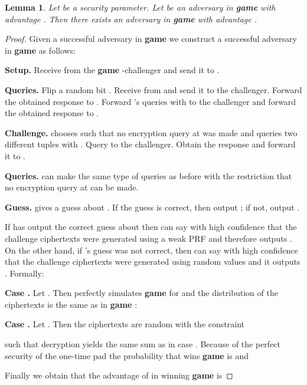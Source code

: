 \documentclass[10pt]{extarticle}
\newtheorem{Lem}[Thm]{Lemma}
\begin{document}
\begin{Lem}\label{gameonetwo} Let  be a security parameter. Let  be an adversary in \textbf{\upshape game } with advantage . Then there exists an adversary  in \textbf{\upshape game } with advantage .
\end{Lem}
\begin{proof} Given a successful adversary  in \textbf{game}  we construct a successful adversary  in \textbf{game}  as follows:
\noindent\begin{description}
 \item\textbf{Setup.} Receive  from the \textbf{game} -challenger and send it to .
\item\textbf{Queries.} Flip a random bit . Receive  from  and send it to the challenger. Forward the obtained response  to . Forward 's queries  with  to the challenger and forward the obtained response  to .
\item\textbf{Challenge.}  chooses  such that no encryption query at  was made and queries two different tuples  with . Query  to the challenger. Obtain the response  and forward it to . 
\item\textbf{Queries.}  can make the same type of queries as before with the restriction that no encryption query at  can be made.
\item\textbf{Guess.}  gives a guess about . If the guess is correct, then output ; if not, output .
\end{description}
If  has output the correct guess about  then  can say with high confidence that the challenge ciphertexts were generated using a weak PRF and therefore outputs . On the other hand, if 's guess was not correct, then  can say with high confidence that the challenge ciphertexts were generated using random values and it outputs . Formally:\par\medskip

\noindent\textbf{Case .} Let . Then  perfectly simulates \textbf{game}  for  and the distribution of the ciphertexts is the same as in \textbf{game} :
\par\medskip

\noindent \textbf{Case .} Let . Then the ciphertexts are random with the constraint 

such that decryption yields the same sum as in case .
Because of the perfect security of the one-time pad the probability that  wins \textbf{game}  is  and

Finally we obtain that the advantage of  in winning \textbf{game}  is

\end{proof}
\end{document}
